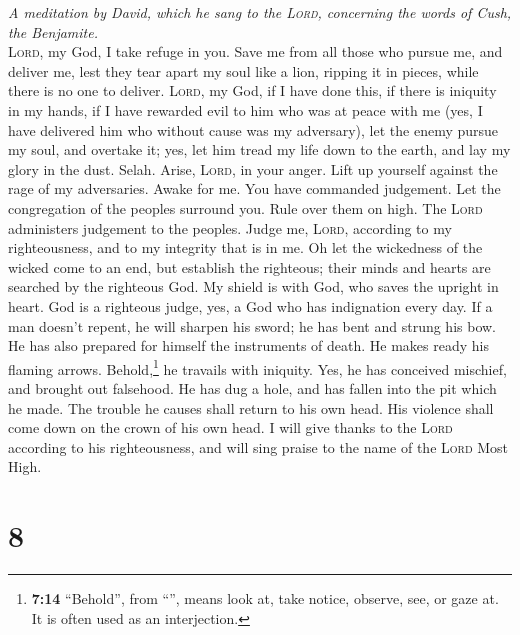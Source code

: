 \emph{A meditation by David, which he sang to the \textsc{Lord},
concerning the words of Cush, the Benjamite.}\\
 \textsc{Lord}, my God, I take refuge in you. Save me from
all those who pursue me, and deliver me,  lest they tear
apart my soul like a lion, ripping it in pieces, while there is no one
to deliver.  \textsc{Lord}, my God, if I have done this,
if there is iniquity in my hands,  if I have rewarded evil
to him who was at peace with me (yes, I have delivered him who without
cause was my adversary),  let the enemy pursue my soul,
and overtake it; yes, let him tread my life down to the earth, and lay
my glory in the dust. Selah.  Arise, \textsc{Lord}, in
your anger. Lift up yourself against the rage of my adversaries. Awake
for me. You have commanded judgement.  Let the
congregation of the peoples surround you. Rule over them on high.
 The \textsc{Lord} administers judgement to the peoples.
Judge me, \textsc{Lord}, according to my righteousness, and to my
integrity that is in me.  Oh let the wickedness of the
wicked come to an end, but establish the righteous; their minds and
hearts are searched by the righteous God.  My shield is
with God, who saves the upright in heart.  God is a
righteous judge, yes, a God who has indignation every day.
 If a man doesn't repent, he will sharpen his sword; he
has bent and strung his bow.  He has also prepared for
himself the instruments of death. He makes ready his flaming arrows.
 Behold,\footnote{\textbf{7:14} ``Behold'', from
  ``'', means look at, take notice, observe, see, or gaze
  at. It is often used as an interjection.} he travails with iniquity.
Yes, he has conceived mischief, and brought out falsehood.
 He has dug a hole, and has fallen into the pit which he
made.  The trouble he causes shall return to his own
head. His violence shall come down on the crown of his own head.
 I will give thanks to the \textsc{Lord} according to his
righteousness, and will sing praise to the name of the \textsc{Lord}
Most High.

\hypertarget{section-7}{%
\section{8}\label{section-7}}

